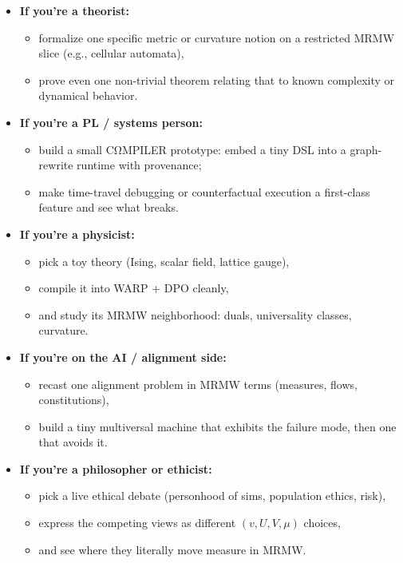\begin{itemize}
  \item \textbf{If you’re a theorist:}
    \begin{itemize}
      \item formalize one specific metric or curvature notion on a restricted MRMW slice (e.g., cellular automata),
      \item prove even one non-trivial theorem relating that to known complexity or dynamical behavior.
    \end{itemize}

  \item \textbf{If you’re a PL / systems person:}
    \begin{itemize}
      \item build a small CΩMPILER prototype: embed a tiny DSL into a graph-rewrite runtime with provenance;
      \item make time-travel debugging or counterfactual execution a first-class feature and see what breaks.
    \end{itemize}

  \item \textbf{If you’re a physicist:}
    \begin{itemize}
      \item pick a toy theory (Ising, scalar field, lattice gauge),
      \item compile it into WARP + DPO cleanly,
      \item and study its MRMW neighborhood: duals, universality classes, curvature.
    \end{itemize}

  \item \textbf{If you’re on the AI / alignment side:}
    \begin{itemize}
      \item recast one alignment problem in MRMW terms (measures, flows, constitutions),
      \item build a tiny multiversal machine that exhibits the failure mode, then one that avoids it.
    \end{itemize}

  \item \textbf{If you’re a philosopher or ethicist:}
    \begin{itemize}
      \item pick a live ethical debate (personhood of sims, population ethics, risk),
      \item express the competing views as different $(v,U,V,\mu)$ choices,
      \item and see where they literally move measure in MRMW.
    \end{itemize}
\end{itemize}

